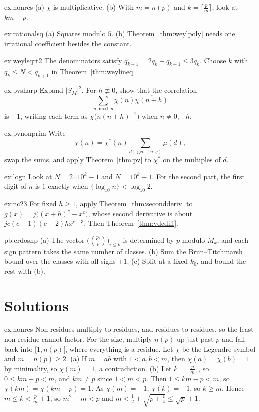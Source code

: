 \begin{hint}{ex:nonres}
(a) $\chi$ is multiplicative. (b) With $m=n(p)$ and $k=\lceil\frac pm\rceil$, look at $km-p$.
\end{hint}
\begin{hint}{ex:rationalsq}
(a) Squares modulo $5$. (b) Theorem~\ref{thm:weylpoly} needs one irrational coefficient besides the constant.
\end{hint}
\begin{hint}{ex:weylsqrt2}
The denominators satisfy $q_{k+1}=2q_k+q_{k-1}\le3q_k$. Choose $k$ with $q_k\le N<q_{k+1}$ in Theorem~\ref{thm:weylineq}.
\end{hint}
\begin{hint}{ex:pvsharp}
Expand $|S_M|^2$. For $h\not\equiv0$, show that the correlation
\[
\sum_{n\bmod p}\chi(n)\overline{\chi(n+h)}
\]
is $-1$, writing each term as $\chi\bigl(n(n+h)^{-1}\bigr)$ when $n\ne0,-h$.
\end{hint}
\begin{hint}{ex:pvnonprim}
Write
\[
\chi(n)=\chi^*(n)\sum_{d\mid\gcd(n,q)}\mu(d),
\]
swap the sums, and apply Theorem~\ref{thm:pv} to $\chi^*$ on the multiples of $d$.
\end{hint}
\begin{hint}{ex:logn}
Look at $N=2\cdot10^k-1$ and $N=10^k-1$. For the second part, the first digit of $n$ is $1$ exactly when $\{\log_{10}n\}<\log_{10}2$.
\end{hint}
\begin{hint}{ex:nc23}
For fixed $h\ge1$, apply Theorem~\ref{thm:secondderiv} to $g(x)=j\bigl((x+h)^c-x^c\bigr)$, whose second derivative is about $jc(c-1)(c-2)hx^{c-3}$. Then Theorem~\ref{thm:vdcdiff}.
\end{hint}

\begin{hint}{pb:erdosnp}
(a) The vector $\bigl((\frac{p_i}p)\bigr)_{i\le k}$ is determined by $p$ modulo $M_k$, and each sign pattern takes the same number of classes. (b) Sum the Brun--Titchmarsh
bound over the classes with all signs $+1$. (c) Split at a fixed $k_0$, and bound the rest with (b).
\end{hint}

\section{Solutions}

\begin{solution}{ex:nonres}
\idea Non-residues multiply to residues, and residues to residues, so the least non-residue cannot factor. For the size, multiply $n(p)$ up just past $p$ and fall back into $[1,n(p)[$, where everything is a residue.
\writeup Let $\chi$ be the Legendre symbol and $m=n(p)\ge2$. (a) If $m=ab$ with $1<a,b<m$, then $\chi(a)=\chi(b)=1$ by minimality, so $\chi(m)=1$, a contradiction. (b) Let $k=\lceil\frac pm\rceil$, so $0\le km-p<m$, and
$km\ne p$ since $1<m<p$. Then $1\le km-p<m$, so $\chi(km)=\chi(km-p)=1$. As $\chi(m)=-1$, $\chi(k)=-1$, so $k\ge m$. Hence $m\le k<\frac pm+1$, so $m^2-m<p$ and $m<\frac12+\sqrt{p+\frac14}\le\sqrt p+1$.
\end{solution}

